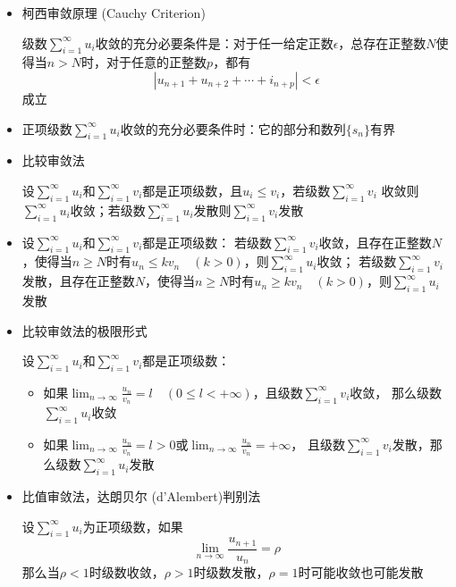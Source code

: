 \documentclass[UTF8]{ctexart}
\newcommand{\abs}[1]{{\left|{#1}\right|}}
\begin{document}
\begin{itemize}
  \item 柯西审敛原理 (Cauchy Criterion)

  级数$\displaystyle\sum_{i=1}^\infty u_i$收敛的充分必要条件是：对于任一给定正数$\epsilon$，总存在正整数$N$使得当$n>N$时，对于任意的正整数$p$，都有
  \[\abs{u_{n+1}+u_{n+2}+\cdots+i_{n+p}}<\epsilon\]
  成立

  \item 正项级数$\displaystyle\sum_{i=1}^\infty u_i$收敛的充分必要条件时：它的部分和数列$\{ s_n \}$有界
  \item 比较审敛法

  设$\displaystyle\sum_{i=1}^\infty u_i$和$\displaystyle\sum_{i=1}^\infty v_i$都是正项级数，且$u_i\le v_i$，若级数$\displaystyle\sum_{i=1}^\infty v_i$
  收敛则$\displaystyle\sum_{i=1}^\infty u_i$收敛；若级数$\displaystyle\sum_{i=1}^\infty u_i$发散则$\displaystyle\sum_{i=1}^\infty v_i$发散

  \item 设$\displaystyle\sum_{i=1}^\infty u_i$和$\displaystyle\sum_{i=1}^\infty v_i$都是正项级数：
  若级数$\displaystyle\sum_{i=1}^\infty v_i$收敛，且存在正整数$N$，使得当$n\ge N$时有$u_n\le kv_n\quad(k>0)$，则$\displaystyle\sum_{i=1}^\infty u_i$收敛；
  若级数$\displaystyle\sum_{i=1}^\infty v_i$发散，且存在正整数$N$，使得当$n\ge N$时有$u_n\ge kv_n\quad(k>0)$，则$\displaystyle\sum_{i=1}^\infty u_i$发散

  \item 比较审敛法的极限形式

  设$\displaystyle\sum_{i=1}^\infty u_i$和$\displaystyle\sum_{i=1}^\infty v_i$都是正项级数：
  \begin{itemize}
    \item 如果$\displaystyle\lim_{n\to\infty}\frac{u_n}{v_n}=l\quad(0\le l<+\infty)$，且级数$\displaystyle\sum_{i=1}^\infty v_i$收敛，
    那么级数$\displaystyle\sum_{i=1}^\infty u_i$收敛
    \item 如果$\displaystyle\lim_{n\to\infty}\frac{u_n}{v_n}=l>0$或$\displaystyle\lim_{n\to\infty}\frac{u_n}{v_n}=+\infty$，
    且级数$\displaystyle\sum_{i=1}^\infty v_i$发散，那么级数$\displaystyle\sum_{i=1}^\infty u_i$发散
  \end{itemize}

  \item 比值审敛法，达朗贝尔 (d'Alembert)判别法

  设$\displaystyle\sum_{i=1}^\infty u_i$为正项级数，如果
  \[\lim_{n\to\infty}\frac{u_{n+1}}{u_n}=\rho\]
  那么当$\rho<1$时级数收敛，$\rho>1$时级数发散，$\rho=1$时可能收敛也可能发散


\end{itemize}
\end{document}
